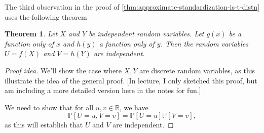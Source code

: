 \documentclass[10pt]{article}
\newtheorem{theorem}{Theorem}
\theoremstyle{definition}
\newcommand{\1}[1]{\textbf{1}_{\left[#1\right]}} %
\def\R{\mathbb{R}} %
\def\P{\mathbb{P}} %
\begin{document}
The third observation in the proof of
\cref{thm:approximate-standardization-is-t-distn} uses the following theorem
\begin{theorem}
  Let $X$ and $Y$ be independent random variables. Let $g(x)$ be a function
  only of $x$ and $h(y)$ a function only of $y$. Then the random variables
  $U=f(X)$ and $V=h(Y)$ are independent.
\end{theorem}
\begin{proof}[Proof idea]
  We'll show the case where $X,Y$ are discrete random variables, as this
  illustrate the idea of the general proof. [In lecture, I only sketched this
  proof, but am including a more detailed version here in the notes for fun.]

  We need to show that for all $u,v\in \R$, we have
  \begin{equation*}
    \P\left[U=u,V=v \right]= \P\left[U=u \right] \P\left[V=v \right],
  \end{equation*}
  as this will establish that $U$ and $V$ are independent.
  

\end{proof}
\end{document}
